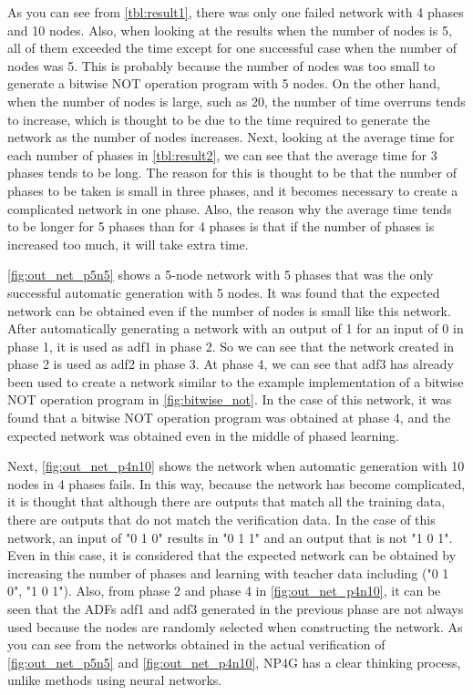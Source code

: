 \documentclass{article}
\begin{document}
As you can see from \ref{tbl:result1}, there was only one failed network with 4 phases and 10 nodes.
Also, when looking at the results when the number of nodes is 5, all of them exceeded the time except for one successful case when the number of nodes was 5.
This is probably because the number of nodes was too small to generate a bitwise NOT operation program with 5 nodes.
On the other hand, when the number of nodes is large, such as 20, the number of time overruns tends to increase, which is thought to be due to the time required to generate the network as the number of nodes increases.
Next, looking at the average time for each number of phases in \ref{tbl:result2}, we can see that the average time for 3 phases tends to be long.
The reason for this is thought to be that the number of phases to be taken is small in three phases, and it becomes necessary to create a complicated network in one phase.
Also, the reason why the average time tends to be longer for 5 phases than for 4 phases is that if the number of phases is increased too much, it will take extra time.

\ref{fig:out_net_p5n5} shows a 5-node network with 5 phases that was the only successful automatic generation with 5 nodes.
It was found that the expected network can be obtained even if the number of nodes is small like this network.
After automatically generating a network with an output of 1 for an input of 0 in phase 1, it is used as adf1 in phase 2. So we can see that the network created in phase 2 is used as adf2 in phase 3.
At phase 4, we can see that adf3 has already been used to create a network similar to the example implementation of a bitwise NOT operation program in \ref{fig:bitwise_not}.
In the case of this network, it was found that a bitwise NOT operation program was obtained at phase 4, and the expected network was obtained even in the middle of phased learning.

Next, \ref{fig:out_net_p4n10} shows the network when automatic generation with 10 nodes in 4 phases fails.
In this way, because the network has become complicated, it is thought that although there are outputs that match all the training data, there are outputs that do not match the verification data.
In the case of this network, an input of "0 1 0" results in "0 1 1" and an output that is not "1 0 1".
Even in this case, it is considered that the expected network can be obtained by increasing the number of phases and learning with teacher data including ("0 1 0", "1 0 1").
Also, from phase 2 and phase 4 in \ref{fig:out_net_p4n10}, it can be seen that the ADFs adf1 and adf3 generated in the previous phase are not always used because the nodes are randomly selected when constructing the network.
As you can see from the networks obtained in the actual verification of \ref{fig:out_net_p5n5} and \ref{fig:out_net_p4n10}, NP4G has a clear thinking process, unlike methods using neural networks.
\end{document}
